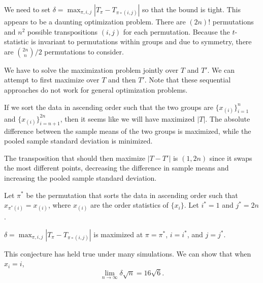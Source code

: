 We need to set $\delta = \max_{\pi, i, j} |T_{\pi} - T_{\pi \circ (i, j)}|$
so that the bound is tight.  This appears to be a daunting
optimization problem.  There are $(2n)!$ permutations and $n^2$
possible transpositions $(i, j)$ for each permutation.  Because the
$t$-statistic is invariant to permutations within groups and due to
symmetry, there are $\binom{2n}{n} / 2$ permutations to consider.

We have to solve the maximization problem jointly over $T$ and $T'$.  We can
attempt to first maximize over $T$ and then $T'$.  Note that these sequential
approaches do not work for general optimization problems.

If we sort the data in ascending order such that the two groups are
$\{x_{(i)}\}_{i=1}^{n}$ and $\{x_{(i)}\}_{i=n+1}^{2n}$, then it seems like
we will have maximized $|T|$.  The absolute difference between the sample
means of the two groups is maximized, while the pooled sample standard
deviation is minimized.

The transposition that should then maximize $|T - T'|$ is $(1, 2n)$ since it
swaps the most different points, decreasing the difference in sample means and
increasing the pooled sample standard deviation.

Let $\pi^*$ be the permutation that sorts the data in ascending order
such that $x_{\pi^*(i)} = x_{(i)}$, where $x_{(i)}$ are the order statistics
of $\{x_i\}$.  Let $i^* = 1$ and $j^* = 2n$.

\begin{conjecture}
  $\delta = \max_{\pi, i, j} |T_{\pi} - T_{\pi \circ (i, j)}|$ is maximized at
  $\pi = \pi^*$, $i = i^*$, and $j = j^*$.
\end{conjecture}

This conjecture has held true under many simulations.  We can show that when $x_i = i$,
\begin{equation*}
  \lim_{n \to \infty} \delta \sqrt{n} = 16 \sqrt{6}.
\end{equation*}


